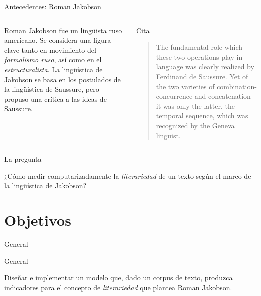 \documentclass[presentation]{beamer}
\begin{document}
\begin{frame}[label={sec:org7c362ad}]{Antecedentes: Roman Jakobson}
\begin{columns}
\begin{column}{0.48\columnwidth}
Roman Jakobson fue un lingüista ruso americano. Se considera una
figura clave tanto en movimiento del \emph{formalismo ruso}, así como
en el \emph{estructuralista}.  La lingüística de Jakobson se basa en
los postulados de la lingüistica de Saussure, \alert{pero} propuso una
crítica a las ideas de Saussure.
\end{column}


\begin{column}{0.48\columnwidth}
\begin{block}{Cita}
\begin{quote}
The fundamental role which these two operations play in language
was clearly realized by Ferdinand de Saussure. Yet of the two
varieties of combination-concurrence and concatenation-it was only
the latter, the temporal sequence, which was recognized by the
Geneva linguist. 
\cite[p. 99]{jakobson1956two}
\end{quote}
\end{block}
\end{column}
\end{columns}
\end{frame}




\begin{frame}[label={sec:org4a753b9}]{La pregunta}
\begin{block}{}
   ¿Cómo medir
   computarizadamente la \emph{literariedad} de un texto según el marco de la
   lingüística de Jakobson?
\end{block}
\end{frame}


\section{Objetivos}
\label{sec:org296dc80}
\begin{frame}[label={sec:org87b3a6d}]{General}
   \begin{block}{General}

Diseñar e implementar un modelo que, dado un corpus de texto, produzca
   indicadores para el concepto de \emph{literariedad} que plantea Roman Jakobson.
     \end{block}
\end{frame}
\end{document}
